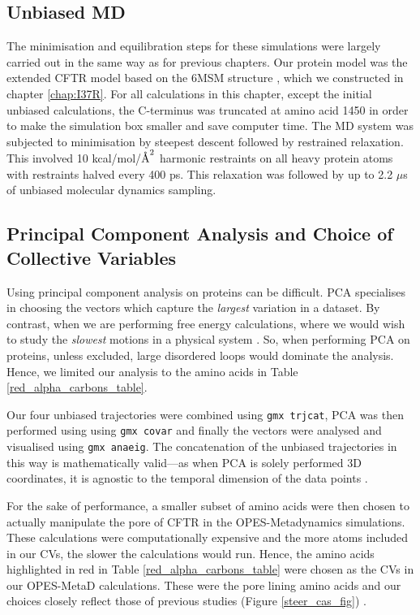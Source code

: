 \subsection{Unbiased MD }
The minimisation and equilibration steps for these simulations were largely carried out in the same way as for previous chapters. Our protein model was the extended CFTR model based on the 6MSM structure \cite{zhang2018}, which we constructed in chapter \ref{chap:I37R}. For all calculations in this chapter, except the initial unbiased calculations, the C-terminus was truncated at amino acid 1450 in order to make the simulation box smaller and save computer time. The MD system was subjected to minimisation by steepest descent followed by restrained relaxation. This involved 10 kcal/mol/$\textup{\AA}^2$ harmonic restraints on all heavy protein atoms with restraints halved every 400 ps. This relaxation was followed by up to 2.2 $\mu$s of unbiased molecular dynamics sampling.

\subsection {Principal Component Analysis and Choice of Collective Variables}
\label {supp_cv_choice}
Using principal component analysis on proteins can be difficult. PCA specialises in choosing the vectors which capture the \textit{largest} variation in a dataset. By contrast, when we are performing free energy calculations, where we would wish to study the \textit{slowest} motions in a physical system \cite{noe2001}. So, when performing PCA on proteins, unless excluded, large disordered loops would dominate the analysis. Hence, we limited our analysis to the amino acids in Table \ref{red_alpha_carbons_table}. 

Our four unbiased trajectories were combined using \verb_gmx trjcat_, PCA was then performed using using \verb_gmx covar_ and finally the vectors were analysed and visualised using \verb_gmx anaeig_. The concatenation of the unbiased trajectories in this way is mathematically valid---as when PCA is solely performed 3D coordinates, it is agnostic to the temporal dimension of the data points \cite{grus2015}.

For the sake of performance, a smaller subset of amino acids were then chosen to actually manipulate the pore of CFTR in the OPES-Metadynamics simulations. These calculations were computationally expensive and the more atoms included in our CVs, the slower the calculations would run. Hence, the amino acids highlighted in red in Table \ref{red_alpha_carbons_table} were chosen as the CVs in our OPES-MetaD calculations. These were the pore lining amino acids and our choices closely reflect those of previous studies (Figure \ref{steer_cas_fig}) \cite{hoffmann2018}. 

